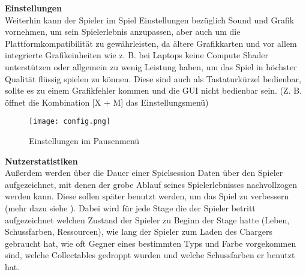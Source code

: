 \textbf{Einstellungen} \\
Weiterhin kann der Spieler im Spiel Einstellungen bezüglich Sound und Grafik vornehmen, um sein Spielerlebnis anzupassen, aber auch um die Plattformkompatibilität zu gewährleisten, da ältere Grafikkarten und vor allem integrierte Grafikeinheiten wie z. B. bei Laptops keine Compute Shader unterstützen oder allgemein zu wenig Leistung haben, um das Spiel in höchster Qualität flüssig spielen zu können. Diese sind auch als Tastaturkürzel bedienbar, sollte es zu einem Grafikfehler kommen und die GUI nicht bedienbar sein. (Z. B. öffnet die Kombination [X + M] das Einstellungsmenü)

\begin{figure}[H]
\centering
\texttt{[image: config.png]}
\caption{Einstellungen im Pausenmenü}
\label{img:gameConfig}
\end{figure}



\textbf{Nutzerstatistiken} \\
Au{\ss}erdem werden über die Dauer einer Spielsession Daten über den Spieler aufgezeichnet, mit denen der grobe Ablauf seines Spielerlebnisses nachvollzogen werden kann. Diese sollen später benutzt werden, um das Spiel zu verbessern (mehr dazu siehe ).
Dabei wird für jede Stage die der Spieler betritt aufgezeichnet welchen Zustand der Spieler zu Beginn der Stage hatte (Leben, Schussfarben, Ressourcen), wie lang der Spieler zum Laden des Chargers gebraucht hat, wie oft Gegner eines bestimmten Typs und Farbe vorgekommen sind, welche Collectables gedroppt wurden und welche Schussfarben er benutzt hat.
